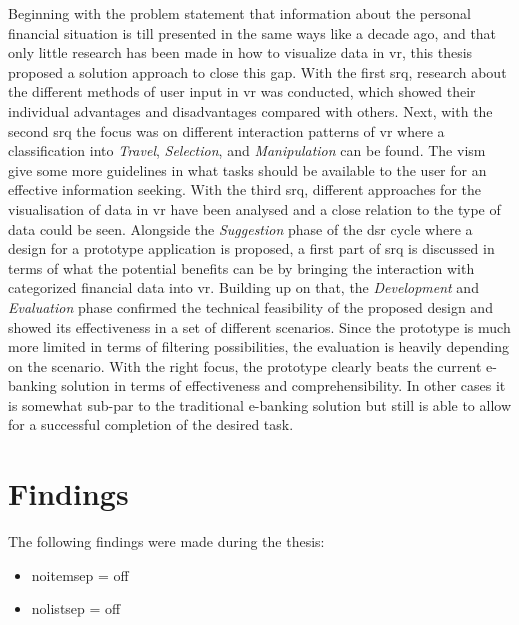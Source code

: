 Beginning with the problem statement that information about the personal financial situation is till presented in the same ways like a decade ago, and that only little research has been made in how to visualize data in \gls{vr}, this thesis proposed a solution approach to close this gap. With the first \gls{srq}, research about the different methods of user input in \gls{vr} was conducted, which showed their individual advantages and disadvantages compared with others. Next, with the second \gls{srq} the focus was on different interaction patterns of \gls{vr} where a classification into \textit{Travel}, \textit{Selection}, and \textit{Manipulation} can be found. The \gls{vism} give some more guidelines in what tasks should be available to the user for an effective information seeking. With the third \gls{srq}, different approaches for the visualisation of data in \gls{vr} have been analysed and a close relation to the type of data could be seen. Alongside the \textit{Suggestion} phase of the \gls{dsr} cycle where a design for a prototype application is proposed, a first part of \gls{srq} is discussed in terms of what the potential benefits can be by bringing the interaction with categorized financial data into \gls{vr}. Building up on that, the \textit{Development} and \textit{Evaluation} phase confirmed the technical feasibility of the proposed design and showed its effectiveness in a set of different scenarios. Since the prototype is much more limited in terms of filtering possibilities, the evaluation is heavily depending on the scenario. With the right focus, the prototype clearly beats the current e-banking solution in terms of effectiveness and comprehensibility. In other cases it is somewhat sub-par to the traditional e-banking solution but still is able to allow for a successful completion of the desired task.



\section{Findings}

The following findings were made during the thesis:
\begin{itemize}[]
	\item noitemsep = off
	\item nolistsep = off
\end{itemize}


